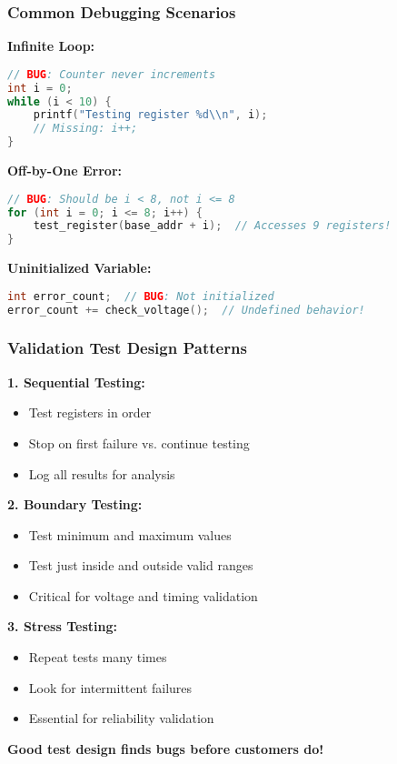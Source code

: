 \documentclass{beamer}
\begin{document}
\begin{frame}[fragile]
\frametitle{Common Debugging Scenarios}
\textbf{Infinite Loop:}
\begin{lstlisting}[language=C]
// BUG: Counter never increments
int i = 0;
while (i < 10) {
    printf("Testing register %d\\n", i);
    // Missing: i++;
}
\end{lstlisting}

\textbf{Off-by-One Error:}
\begin{lstlisting}[language=C]
// BUG: Should be i < 8, not i <= 8
for (int i = 0; i <= 8; i++) {
    test_register(base_addr + i);  // Accesses 9 registers!
}
\end{lstlisting}

\textbf{Uninitialized Variable:}
\begin{lstlisting}[language=C]
int error_count;  // BUG: Not initialized
error_count += check_voltage();  // Undefined behavior!
\end{lstlisting}
\end{frame}

\begin{frame}
\frametitle{Validation Test Design Patterns}
\textbf{1. Sequential Testing:}
\begin{itemize}
    \item Test registers in order
    \item Stop on first failure vs. continue testing
    \item Log all results for analysis
\end{itemize}

\textbf{2. Boundary Testing:}
\begin{itemize}
    \item Test minimum and maximum values
    \item Test just inside and outside valid ranges
    \item Critical for voltage and timing validation
\end{itemize}

\textbf{3. Stress Testing:}
\begin{itemize}
    \item Repeat tests many times
    \item Look for intermittent failures
    \item Essential for reliability validation
\end{itemize}

\vspace{0.5cm}
\begin{center}
\textbf{Good test design finds bugs before customers do!}
\end{center}
\end{frame}
\end{document}
